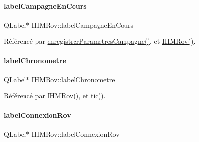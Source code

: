 \mbox{\label{class_i_h_m_rov_a14aa781bc1a446ba6b3ecdea029caa91}} 
\paragraph{\texorpdfstring{label\+Campagne\+En\+Cours}{labelCampagneEnCours}}
{\footnotesize\ttfamily Q\+Label$\ast$ I\+H\+M\+Rov\+::label\+Campagne\+En\+Cours\hspace{0.3cm}{\ttfamily [private]}}



Référencé par \hyperlink{class_i_h_m_rov_a229194814bfb1fc94ab3cc86d6411921}{enregistrer\+Parametres\+Campagne()}, et \hyperlink{class_i_h_m_rov_a5dac1fb4612866cc61f699a415e0ef6b}{I\+H\+M\+Rov()}.

\mbox{\label{class_i_h_m_rov_a32e5cb80ecae7bad6914c690ebd93995}} 
\paragraph{\texorpdfstring{label\+Chronometre}{labelChronometre}}
{\footnotesize\ttfamily Q\+Label$\ast$ I\+H\+M\+Rov\+::label\+Chronometre\hspace{0.3cm}{\ttfamily [private]}}



Référencé par \hyperlink{class_i_h_m_rov_a5dac1fb4612866cc61f699a415e0ef6b}{I\+H\+M\+Rov()}, et \hyperlink{class_i_h_m_rov_a4a0d3a0741d0669ede732b630eae54c6}{tic()}.

\mbox{\label{class_i_h_m_rov_ac52c67da33e4d4c40b4c485c09452142}} 
\paragraph{\texorpdfstring{label\+Connexion\+Rov}{labelConnexionRov}}
{\footnotesize\ttfamily Q\+Label$\ast$ I\+H\+M\+Rov\+::label\+Connexion\+Rov\hspace{0.3cm}{\ttfamily [private]}}



